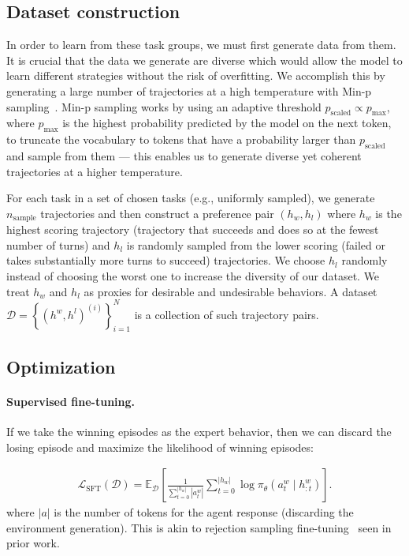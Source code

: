 \subsection{Dataset construction}

In order to learn from these task groups, we must first generate data from them. It is crucial that the data we generate are diverse which would allow the model to learn different strategies without the risk of overfitting. We accomplish this by generating a large number of trajectories at a high temperature with Min-p sampling~\citep{nguyen2024turning}. Min-p sampling works by using an adaptive threshold $p_\text{scaled} \propto p_\text{max}$, where $p_\text{max}$ is the highest probability predicted by the model on the next token, to truncate the vocabulary to tokens that have a probability larger than $p_\text{scaled}$ and sample from them --- this enables us to generate diverse yet coherent trajectories at a higher temperature.


For each task in a set of chosen tasks (e.g., uniformly sampled), we generate $n_\text{sample}$ trajectories and then construct a preference pair $(h_{w}, h_{l})$ where $h_{w}$ is the highest scoring trajectory (trajectory that succeeds and does so at the fewest number of turns) and $h_{l}$ is randomly sampled from the lower scoring (failed  or takes substantially more turns to succeed) trajectories. We choose $h_l$ randomly instead of choosing the worst one to increase the diversity of our dataset. We treat $h_w$ and $h_l$ as proxies for desirable and undesirable behaviors. A dataset $\mathcal{D} = \left\{\left(h^{w}, h^{l}\right)^{(i)}\right\}_{i=1}^N$ is a collection of such trajectory pairs.

\subsection{Optimization}
\label{sec:opt}

\paragraph{Supervised fine-tuning.} If we take the winning episodes as the expert behavior, then we can discard the losing episode and maximize the likelihood of winning episodes:

\begin{align}
    \mathcal{L}_\text{SFT}(\mathcal{D}) = \mathbb{E}_{\mathcal{D}} \left[ \frac{1}{\sum_{t=0}^{|h_w|}|a_t^w|}\sum_{t=0}^{|h_w|} \log \pi_\theta \left(a^w_t \mid h^w_{:t}\right) \right].
\end{align}
where $|a|$ is the number of tokens for the agent response (discarding the environment generation). This is akin to rejection sampling fine-tuning~\citep{gulcehre2023reinforcedselftrainingrestlanguage,dong2023raft,mukobi2023superhfsupervisediterativelearning} seen in prior work.

